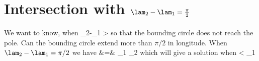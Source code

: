 \documentclass[preprint,12pt]{article}
\begin{document}
\section{Intersection with $\lam_2-\lam_1 = \frac{\pi}{2}$}

We want to know, when 
\be
\varphi_2-\varphi_1 > 
\ee
so that the bounding circle does not reach the pole. Can the bounding circle extend more than  $\pi/2$ in longitude.
When $\lam_2-\lam_1 = \pi/2$ we have
 \bea
\cos {} &=& \sin \vphi_1 \sin \vphi_2 
 \eea
 which will give a solution when
 \be
 \cos {}< \sin\vphi_1
 \ee
 


\end{document}
